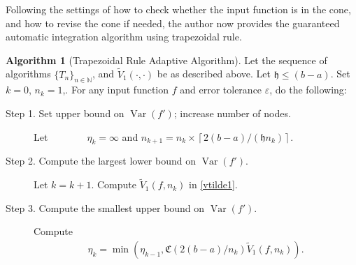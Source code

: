 \documentclass{iitthesis}
\DeclareMathOperator{\Var}{Var}
\theoremstyle{definition}
\newtheorem{algo}{Algorithm}
\theoremstyle{remark}
\begin{document}
Following the settings of how to check whether the input function is in the cone, and how to revise the cone if needed, the author now provides the guaranteed automatic integration algorithm using trapezoidal rule.
\begin{algo}[Trapezoidal Rule Adaptive Algorithm] \label{multistagetrapalgo}
Let the sequence of algorithms $\{T_n\}_{n\in \mathbb{N}}$, %
and $\widetilde{V}_1(\cdot,\cdot)$ be as described above.
Let $\mathfrak{h}\le (b-a)$. Set $k=0$, $n_{k}=1$,. For any input function $f$ and error tolerance $\varepsilon$, do the following: %
\begin{description}
\item[Step 1. Set upper bound on $\Var(f')$; increase number of nodes.] Let $\quad$ $\qquad$ $\eta_{k}=\infty$ and $n_{k+1}=n_k\times\left\lceil2(b-a)/(\mathfrak{h}n_{k})\right\rceil$.

\item[Step 2. Compute the largest lower bound on {$\Var(f')$}.] Let $k=k+1$. Compute  $\widetilde{V}_1(f,n_k)$ in \eqref{vtilde1}.%

\item[Step 3. Compute the smallest upper bound on {$\Var(f')$}.] Compute
    \begin{align*}
        \eta_{k}=\min\left(\eta_{k-1},\mathfrak{C}(2(b-a)/n_{k})\widetilde{V}_1(f,n_k)\right).
    \end{align*}


\end{description}
\end{algo}
\end{document}
